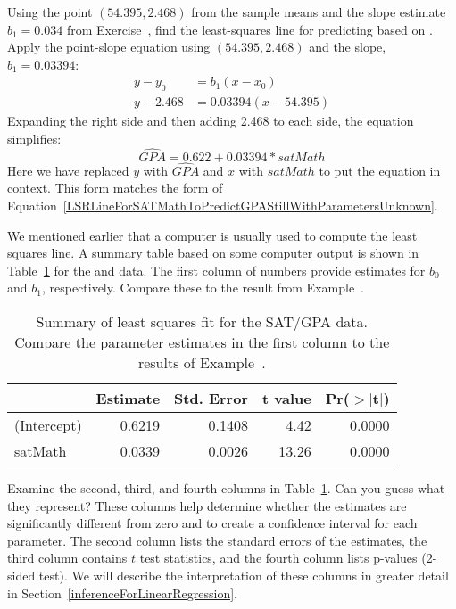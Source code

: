 \begin{example}{Using the point $(54.395, 2.468)$ from the sample means and the slope estimate $b_1 = 0.034$ from Exercise~, find the least-squares line for predicting  based on .} \label{exampleToFindLSRLineOfSATGPAData}
Apply the point-slope equation using $(54.395, 2.468)$ and the slope, $b_1 = 0.03394$:
\begin{align*}
y - y_0     &= b_1 (x - x_0) \\
y - 2.468  &= 0.03394(x - 54.395)
\end{align*}
Expanding the right side and then adding 2.468 to each side, the equation simplifies:
$$ \widehat{GPA} = 0.622 + 0.03394 * satMath $$
Here we have replaced $y$ with $\widehat{GPA}$ and $x$ with $satMath$ to put the equation in context. This form matches the form of Equation~\eqref{LSRLineForSATMathToPredictGPAStillWithParametersUnknown}.
\end{example}

We mentioned earlier that a computer is usually used to compute the least squares line. A summary table based on some computer output is shown in Table~\ref{rOutputForSATGPALSRLine} for the  and  data. The first column of numbers provide estimates for ${b}_0$ and ${b}_1$, respectively. Compare these to the result from Example~.


\pagebreak

\begin{table}[ht]
\centering
\begin{tabular}{l rrrr}
  \hline
 & Estimate & Std. Error & t value & Pr($>$$|$t$|$) \\ 
  \hline
(Intercept) & 0.6219 & 0.1408 & 4.42 & 0.0000 \\ 
 satMath & 0.0339 & 0.0026 & 13.26 & 0.0000 \\ 
   \hline
\end{tabular}
\caption{Summary of least squares fit for the SAT/GPA data. Compare the parameter estimates in the first column to the results of Example~.\vspace{-3mm}}
\label{rOutputForSATGPALSRLine}
\end{table}

\begin{example}{Examine the second, third, and fourth columns in Table~\ref{rOutputForSATGPALSRLine}. Can you guess what they represent?}
These columns help determine whether the estimates are significantly different from zero and to create a confidence interval for each parameter. The second column lists the standard errors of the estimates, the third column contains $t$ test statistics, and the fourth column lists p-values (2-sided test). We will describe the interpretation of these columns in greater detail in Section~\ref{inferenceForLinearRegression}.
\end{example}

